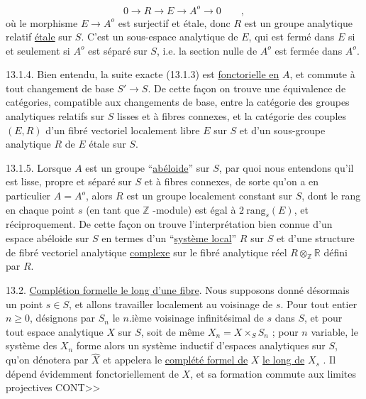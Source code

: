 \begin{equation}\tag{13.1.3}
0 \longrightarrow R \longrightarrow E \longrightarrow A^{o} \longrightarrow 0 \qquad ,
\end{equation}
où le morphisme $E \longrightarrow A^{o}$ est surjectif et étale, donc $R$ est un groupe analytique relatif \underline{étale} sur $S$. C'est un sous-espace analytique de $E$, qui est fermé dans $E$ si et seulement si $A^{o}$ est séparé sur $S$, i.e. la section nulle de $A^{o}$ est fermée dans $A^{o}$.



13.1.4. Bien entendu, la suite exacte (13.1.3) est \underline{fonctorielle en} $A$, et commute à tout changement de base $S' \longrightarrow S$. De cette façon on trouve une équivalence de catégories, compatible aux changements de base, entre la catégorie des groupes analytiques relatifs sur $S$ lisses et à fibres connexes, et la catégorie des couples $(E,R)$ d'un fibré vectoriel localement libre $E$ sur $S$ et d'un sous-groupe analytique $R$ de $E$ étale sur $S$.

13.1.5. Lorsque $A$ est un groupe ``\underline{abéloide}'' sur $S$, par quoi nous entendons qu'il est lisse, propre et séparé sur $S$ et à fibres connexes, de sorte qu'on a en particulier $A=A^{o}$, alors $R$ est un groupe localement constant sur $S$, dont le rang en chaque point $s$ (en tant que $\mathbb{Z}$ -module) est égal à $2\ \mathrm{rang}_s(E)$, et réciproquement. De cette façon on trouve l'interprétation bien connue d'un espace abéloide sur $S$ en termes d'un ``\underline{système local}'' $R$ sur $S$ et d'une structure de fibré vectoriel analytique \underline{complexe} sur le fibré analytique réel $R \otimes_{\mathbb{Z}} \mathbb{R}$ défini par $R$.

13.2. \underline{Complétion formelle le long d'une fibre}. Nous supposons donné désormais un point $s \in S$, et allons travailler localement au voisinage de $s$. Pour tout entier $n \geq 0$, désignons par $S_n$ le $n$.ième voisinage infinitésimal de $s$ dans $S$, et pour tout espace analytique $X$ sur $S$, soit de même $X_n=X\times_S S_n$ ; pour $n$ variable, le système des $X_n$ forme alors un système inductif d'espaces analytiques sur $S$, qu'on dénotera par $\hat{X}$ et appelera le \underline{complété formel de} $X$ \underline{le long de} $X_s$ . Il dépend évidemment fonctoriellement de $X$, et sa formation commute aux limites projectives CONT>>



